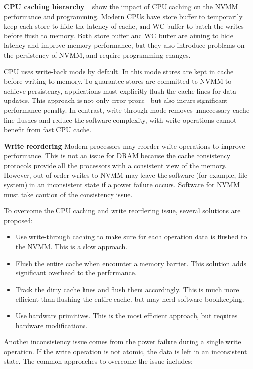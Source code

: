 \textbf{CPU caching hierarchy}
~\cite{CPUcaching} show the impact of CPU caching on the NVMM performance
and programming. Modern CPUs have store buffer to temporarily keep each store
to hide the latency of cache, and WC buffer to batch the writes before
flush to memory. Both store buffer and WC buffer are aiming to hide latency
and improve memory performance, but they also introduce problems on the
persistency of NVMM, and require programming changes.

CPU uses write-back mode by default. In this mode stores are kept in cache
before writing to memory. To guarantee stores are committed to NVMM to achieve
persistency, applications must explicitly flush the cache lines for data
updates. This approach is not only error-prone~\cite{singlelock}
but also incurs significant
performance penalty. In contrast, write-through mode removes unnecessary
cache line flushes and reduce the software complexity, with write operations
cannot benefit from fast CPU cache.

\textbf{Write reordering} Modern processors may reorder write operations to improve
performance. This is not an issue for DRAM because the cache consistency
protocols provide all the processors with a consistent view of the memory.
However, out-of-order writes to NVMM may leave the software (for example,
file system) in an inconsistent state if a power failure occurs. Software
for NVMM must take caution of the consistency issue. 

To overcome the CPU caching and write reordering issue,
several solutions are proposed:

\begin{itemize}
\item Use write-through caching to make sure for each operation
data is flushed to the NVMM. This is a slow approach. 
\item Flush the entire cache when encounter a memory barrier. This solution
adds significant overhead to the performance.
\item Track the dirty cache lines and flush them accordingly. This is much
more efficient than flushing the entire cache, but may need software bookkeeping.
\item Use hardware primitives. This is the most efficient approach, but requires
hardware modifications.
\end{itemize}

Another inconsistency issue comes from the power failure during a single
write operation. If the write operation is not atomic, the data is left
in an inconsistent state. The common approaches to overcome the issue includes:

